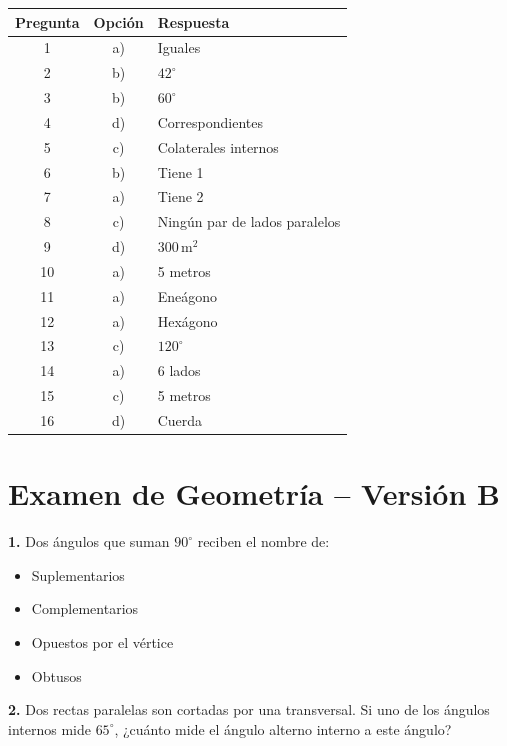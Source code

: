 \begin{center}
\begin{tabular}{|c|c|l|}
\hline
\textbf{Pregunta} & \textbf{Opción} & \textbf{Respuesta} \\ \hline
1  & a) & Iguales \\ \hline
2  & b) & $42^\circ$ \\ \hline
3  & b) & $60^\circ$ \\ \hline
4  & d) & Correspondientes \\ \hline
5  & c) & Colaterales internos \\ \hline
6  & b) & Tiene 1 \\ \hline
7  & a) & Tiene 2 \\ \hline
8  & c) & Ningún par de lados paralelos \\ \hline
9  & d) & $300\,\text{m}^2$ \\ \hline
10 & a) & 5 metros  \\ \hline
11 & a) & Eneágono \\ \hline
12 & a) & Hexágono \\ \hline
13 & c) & $120^\circ$ \\ \hline
14 & a) & 6 lados \\ \hline
15 & c) & 5 metros \\ \hline
16 & d) & Cuerda \\ \hline
\end{tabular}
\end{center}


\newpage

\section*{Examen de Geometría -- Versión B}

\noindent\textbf{1.} Dos ángulos que suman $90^\circ$ reciben el nombre de:

\begin{itemize}
    \item[a)] Suplementarios
    \item[b)] Complementarios
    \item[c)] Opuestos por el vértice
    \item[d)] Obtusos
\end{itemize}


\noindent\textbf{2.} Dos rectas paralelas son cortadas por una transversal. Si uno de los ángulos internos mide $65^\circ$, ¿cuánto mide el ángulo alterno interno a este ángulo?

